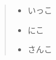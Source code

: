 \documentclass{jarticle}
\begin{document}
\begin{quote}
    \begin{itemize}
        \item いっこ
        \item にこ
        \item さんこ
    \end{itemize}
\end{quote}
\end{document}
